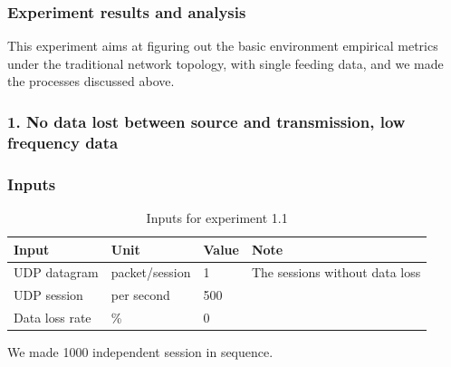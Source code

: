 \documentclass[11pt,openright,a4paper]{report}
\begin{document}
\subsubsection{Experiment results and analysis}
This experiment aims at figuring out the basic environment empirical metrics under the traditional network topology, with single feeding data, and we made the processes discussed above.
\subsubsection{1. No data lost between source and transmission, low frequency data}
\subsubsection{Inputs}
\begin{table}[H]
	\centering
	\caption{Inputs for experiment 1.1}
	\label{my-label}
	\begin{tabular}{@{}llll@{}}
		\toprule
		Input          & Unit & Value           & Note                           \\ \midrule
		UDP datagram   & packet/session & 1     & The sessions without data loss \\
		UDP session & per second   & 500         &                                \\
		Data loss rate & \%   & 0         &                                \\
		 \bottomrule
	\end{tabular}
\end{table}
We made 1000 independent session in sequence.
\end{document}
